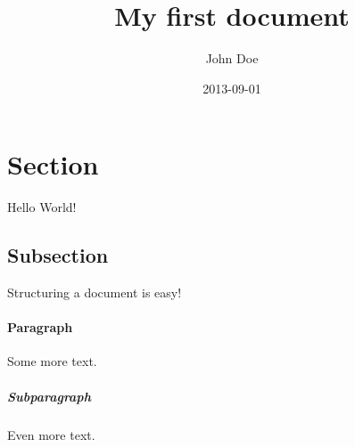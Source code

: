 \documentclass{article}
\title{My first document}
\date{2013-09-01}
\author{John Doe}
\begin{document}
    \maketitle
  
    \section{Section}
    Hello World!
    
    \subsection{Subsection}
    Structuring a document is easy!
    
    \paragraph{Paragraph}

    Some more text.
    
    \subparagraph{Subparagraph}

Even more text.
\end{document}
